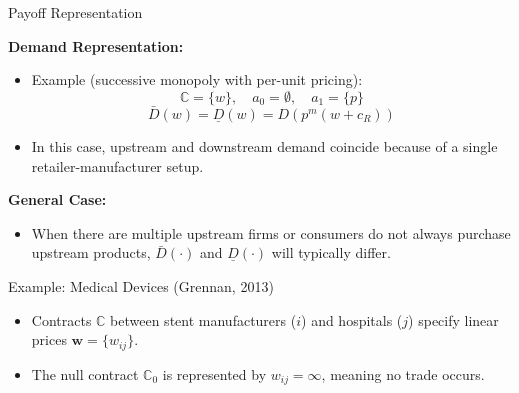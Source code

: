 \documentclass[aspectratio=169]{beamer}  %
\begin{document}
\begin{frame}{Payoff Representation}
  
    \textbf{Demand Representation:}
    \begin{itemize}
        \item Example (successive monopoly with per-unit pricing):
        \[
        \mathbb{C} = \{w\}, \quad a_0 = \emptyset, \quad a_1 = \{p\}
        \]
        \[
        \bar{D}(w) = \underline{D}(w) = D\left(p^m\left(w + c_R\right)\right)
        \]
        \item In this case, upstream and downstream demand coincide because of a single retailer-manufacturer setup.
    \end{itemize}

    \vspace{0.3cm}
    \textbf{General Case:}
    \begin{itemize}
        \item When there are multiple upstream firms or consumers do not always purchase upstream products, \(\bar{D}(\cdot)\) and \(\underline{D}(\cdot)\) will typically differ.
    \end{itemize}
\end{frame}

\begin{frame}{Example: Medical Devices (Grennan, 2013)}
    \begin{itemize}
        \item Contracts \(\mathbb{C}\) between stent manufacturers (\(i\)) and hospitals (\(j\)) specify linear prices \(\boldsymbol{w} = \{w_{ij}\}\).
        \item The null contract \(\mathbb{C}_0\) is represented by \(w_{ij} = \infty\), meaning no trade occurs.
    \end{itemize}
\end{frame}
\end{document}

